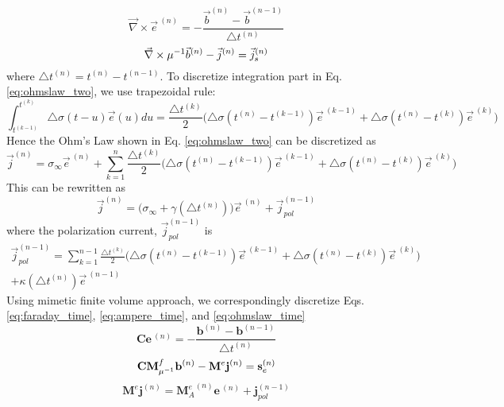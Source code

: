 \documentclass[extra,mreferee]{gji}
\newcommand{\curl}{{\vec \nabla}\times}
\newcommand{\siginf}{\sigma_\infty}
\newcommand{\dsig}{\triangle\sigma}
\newcommand{\dcurl}{{\mathbf C}}
\newcommand{\M}{{\mathbf M}}
\newcommand{\MfMui}{{\M^f_{\mu^{-1}}}}
\newcommand{\Me}{{\M^e}}
\newcommand{\Mes}[1]{{\M^e_{#1}}}
\renewcommand {\j}  { {\vec j} }
\renewcommand {\b}  { {\vec b} }
\newcommand {\e}  { {\vec e} }
\renewcommand {\dj}  { {\mathbf{j} } }
\newcommand {\db}  { {\mathbf{b} } }
\newcommand {\de}  { {\mathbf{e} } }
\begin{document}
\begin{equation}
  \curl \e^{\ (n)} = -\frac{\b^{(n)}-\b^{(n-1)}}{\triangle t^{(n)}}
  \label{eq:faraday_time}
\end{equation}
\begin{equation}
  \curl \mu^{-1} \b^{(n)} - \j^{(n)} = \j_s^{(n)} \\
  \label{eq:ampere_time}
\end{equation}
where $\triangle t^{(n)} = t^{(n)}- t^{(n-1)}$.
To discretize integration part in Eq. \ref{eq:ohmslaw_two}, we use trapezoidal rule:
\begin{equation}
  \int_{t^{(k-1)}}^{t^{(k)}} \dsig(t-u) \e (u) du
  = \frac{\triangle t^{(k)}}{2} \Big(\dsig (t^{(n)} - t^{(k-1)}) \e^{\ (k-1)} + \dsig (t^{(n)} - t^{(k)}) \e^{\ (k)} \Big)
\end{equation}
Hence the Ohm's Law shown in Eq. \ref{eq:ohmslaw_two} can be discretized as
\begin{equation}
  \j^{(n)} = \siginf \e^{\ (n)} +
  \sum_{k=1}^{n} \frac{\triangle t^{(k)}}{2} \Big(\dsig (t^{(n)} - t^{(k-1)}) \e^{\ (k-1)} + \dsig (t^{(n)} - t^{(k)}) \e^{\ (k)} \Big)
\end{equation}
This can be rewritten as
\begin{equation}
  \j^{(n)} = \Big(\siginf + \gamma (\triangle t^{(n)})\Big)\e^{\ (n)} + \j_{pol}^{(n-1)}
  \label{eq:ohmslaw_time}
\end{equation}
where the polarization current, $\j_{pol}^{(n-1)}$ is
\begin{align}
  \j_{pol}^{(n-1)} = \sum_{k=1}^{n-1} \frac{\triangle t^{(k)}}{2} \Big(\dsig (t^{(n)} - t^{(k-1)}) \e^{\ (k-1)} + \dsig (t^{(n)} - t^{(k)}) \e^{\ (k)} \Big) \nonumber \\
  +  \kappa(\triangle t^{(n)}) \e^{\ (n-1)}
\end{align}
Using mimetic finite volume approach, we correspondingly discretize Eqs. \ref{eq:faraday_time}, \ref{eq:ampere_time}, and \ref{eq:ohmslaw_time}
\begin{equation}
  \dcurl \de^{\ (n)} = -\frac{\db^{(n)}-\db^{(n-1)}}{\triangle t^{(n)}}
    \label{eq:faraday_discrete}
\end{equation}
\begin{equation}
  \dcurl \MfMui \db^{(n)} - \Me \dj^{(n)} = \mathbf{s}_e^{(n)} \\
  \label{eq:ampere_discrete}
\end{equation}
\begin{equation}
  \Me\dj^{(n)} = \Mes{A}^{(n)}\de^{\ (n)} + \dj_{pol}^{(n-1)}
  \label{eq:ohmslaw_discrete}
\end{equation}
\end{document}
